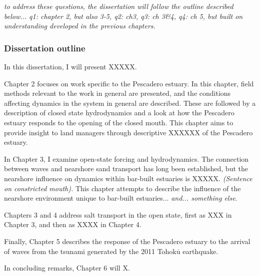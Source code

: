 \emph{to address these questions, the dissertation will follow the outline described below... q1: chapter 2, but also 3-5, q2: ch3, q3: ch 3\&4, q4: ch 5, but built on understanding developed in the previous chapters.}


\subsubsection{Dissertation outline}

In this dissertation, I will present XXXXX.

Chapter 2 focuses on work specific to the Pescadero estuary. In this chapter, field methods relevant to the work in general are presented, and the conditions affecting dynamics in the system in general are described. These are followed by a description of closed state hydrodynamics and a look at how the Pescadero estuary responds to the opening of the closed mouth. This chapter aims to provide insight to land managers through descriptive XXXXXX of the Pescadero estuary.

In Chapter 3, I examine open-state forcing and hydrodynamics. The connection between waves and nearshore sand transport has long been established, but the nearshore influence on dynamics within bar-built estuaries is XXXXX. \emph{(Sentence on constricted mouth).} This chapter attempts to describe the influence of the nearshore environment unique to bar-built estuaries... \emph{and... something else}. 

Chapters 3 and 4 address salt transport in the open state, first as XXX in Chapter 3, and then as XXXX in Chapter 4. 

Finally, Chapter 5 describes the response of the Pescadero estuary to the arrival of waves from the tsunami generated by the 2011 Tohok$\overline{\mathrm{u}}$ earthquake. 

In concluding remarks, Chapter 6 will X. 

















